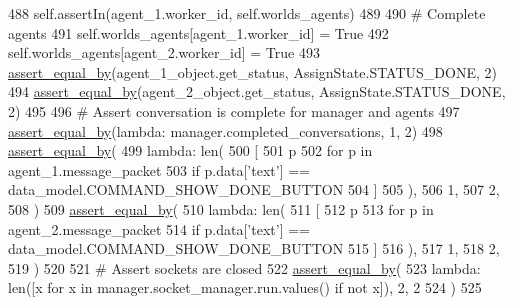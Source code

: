 \begin{DoxyCode}
488         self.assertIn(agent\_1.worker\_id, self.worlds\_agents)
489 
490         \textcolor{comment}{# Complete agents}
491         self.worlds\_agents[agent\_1.worker\_id] = \textcolor{keyword}{True}
492         self.worlds\_agents[agent\_2.worker\_id] = \textcolor{keyword}{True}
493         \hyperlink{namespaceparlai_1_1mturk_1_1core_1_1test_1_1test__full__system_a0b463246d35658a2e422010f13dcf819}{assert\_equal\_by}(agent\_1\_object.get\_status, AssignState.STATUS\_DONE, 2)
494         \hyperlink{namespaceparlai_1_1mturk_1_1core_1_1test_1_1test__full__system_a0b463246d35658a2e422010f13dcf819}{assert\_equal\_by}(agent\_2\_object.get\_status, AssignState.STATUS\_DONE, 2)
495 
496         \textcolor{comment}{# Assert conversation is complete for manager and agents}
497         \hyperlink{namespaceparlai_1_1mturk_1_1core_1_1test_1_1test__full__system_a0b463246d35658a2e422010f13dcf819}{assert\_equal\_by}(\textcolor{keyword}{lambda}: manager.completed\_conversations, 1, 2)
498         \hyperlink{namespaceparlai_1_1mturk_1_1core_1_1test_1_1test__full__system_a0b463246d35658a2e422010f13dcf819}{assert\_equal\_by}(
499             \textcolor{keyword}{lambda}: len(
500                 [
501                     p
502                     \textcolor{keywordflow}{for} p \textcolor{keywordflow}{in} agent\_1.message\_packet
503                     \textcolor{keywordflow}{if} p.data[\textcolor{stringliteral}{'text'}] == data\_model.COMMAND\_SHOW\_DONE\_BUTTON
504                 ]
505             ),
506             1,
507             2,
508         )
509         \hyperlink{namespaceparlai_1_1mturk_1_1core_1_1test_1_1test__full__system_a0b463246d35658a2e422010f13dcf819}{assert\_equal\_by}(
510             \textcolor{keyword}{lambda}: len(
511                 [
512                     p
513                     \textcolor{keywordflow}{for} p \textcolor{keywordflow}{in} agent\_2.message\_packet
514                     \textcolor{keywordflow}{if} p.data[\textcolor{stringliteral}{'text'}] == data\_model.COMMAND\_SHOW\_DONE\_BUTTON
515                 ]
516             ),
517             1,
518             2,
519         )
520 
521         \textcolor{comment}{# Assert sockets are closed}
522         \hyperlink{namespaceparlai_1_1mturk_1_1core_1_1test_1_1test__full__system_a0b463246d35658a2e422010f13dcf819}{assert\_equal\_by}(
523             \textcolor{keyword}{lambda}: len([x \textcolor{keywordflow}{for} x \textcolor{keywordflow}{in} manager.socket\_manager.run.values() \textcolor{keywordflow}{if} \textcolor{keywordflow}{not} x]), 2, 2
524         )
525 
\end{DoxyCode}


